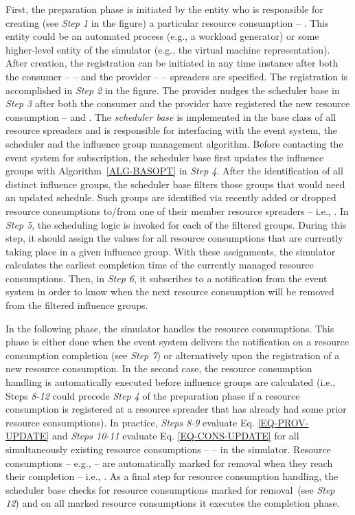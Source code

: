 \documentclass[sort, compress, 5p]{elsarticle}
\begin{document}
First, the preparation phase is initiated by the entity who is responsible for creating (see \emph{Step 1} in the figure) a particular resource consumption -- . This entity could be an automated process (e.g., a workload generator) or some higher-level entity of the simulator (e.g., the virtual machine representation). After creation, the registration can be initiated in any time instance  after both the consumer --  -- and the provider --  -- spreaders are specified. The registration is accomplished in \emph{Step 2} in the figure. The provider nudges the scheduler base in \emph{Step 3} after both the consumer and the provider have registered the new resource consumption --  and . The \emph{scheduler base} is implemented in the base class of all resource spreaders and is responsible for interfacing with the event system, the scheduler and the influence group management algorithm. Before contacting the event system for subscription, the scheduler base first updates the influence groups with Algorithm~\ref{ALG-BASOPT} in \emph{Step 4}. After the identification of all distinct influence groups, the scheduler base filters those groups that would need an updated schedule. Such groups are identified via recently added or dropped resource consumptions to/from one of their member resource spreaders -- i.e., . In \emph{Step 5}, the scheduling logic is invoked for each of the filtered groups. During this step, it should assign the  values for all resource consumptions that are currently taking place in a given influence group. With these assignments, the simulator calculates the earliest completion time of the currently managed resource consumptions. Then, in \emph{Step 6}, it subscribes to a notification from the event system in order to know when the next resource consumption will be removed from the filtered influence groups.

In the following phase, the simulator handles the resource consumptions. This phase is either done when the event system delivers the notification on a resource consumption completion (see \emph{Step 7}) or alternatively upon the registration of a new resource consumption. In the second case, the resource consumption handling is automatically executed before influence groups are calculated (i.e., Steps \emph{8-12} could precede \emph{Step 4} of the preparation phase if a resource consumption is registered at a resource spreader that has already had some prior resource consumptions). In practice, \emph{Steps 8-9} evaluate Eq. \ref{EQ-PROV-UPDATE} and \emph{Steps 10-11} evaluate Eq. \ref{EQ-CONS-UPDATE} for all simultaneously existing resource consumptions --  -- in the simulator. Resource consumptions -- e.g.,  -- are automatically marked for removal when they reach their completion -- i.e., . As a final step for resource consumption handling, the scheduler base checks for resource consumptions marked for removal~(see \emph{Step 12}) and on all marked resource consumptions it executes the completion phase. 
\end{document}
